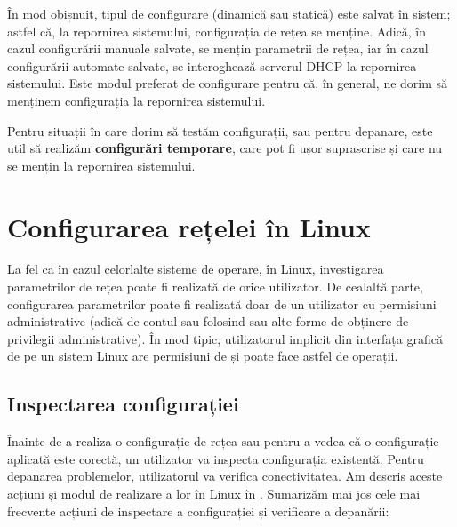 În mod obișnuit, tipul de configurare (dinamică sau statică) este salvat în sistem; astfel că, la repornirea sistemului, configurația de rețea se menține.
Adică, în cazul configurării manuale salvate, se mențin parametrii de rețea, iar în cazul configurării automate salvate, se interoghează serverul DHCP la repornirea sistemului.
Este modul preferat de configurare pentru că, în general, ne dorim să menținem configurația la repornirea sistemului.

Pentru situații în care dorim să testăm configurații, sau pentru depanare, este util să realizăm \textbf{configurări temporare}, care pot fi ușor suprascrise și care nu se mențin la repornirea sistemului.

\section{Configurarea rețelei în Linux}
\label{sec:net:linux-config}

La fel ca în cazul celorlalte sisteme de operare, în Linux, investigarea parametrilor de rețea poate fi realizată de orice utilizator.
De cealaltă parte, configurarea parametrilor poate fi realizată doar de un utilizator cu permisiuni administrative (adică de contul  sau folosind  sau alte forme de obținere de privilegii administrative).
În mod tipic, utilizatorul implicit din interfața grafică de pe un sistem Linux are permisiuni de  și poate face astfel de operații.

\subsection{Inspectarea configurației}
\label{sec:net:linux-config:inspect}

Înainte de a realiza o configurație de rețea sau pentru a vedea că o configurație aplicată este corectă, un utilizator va inspecta configurația existentă.
Pentru depanarea problemelor, utilizatorul va verifica conectivitatea.
Am descris aceste acțiuni și modul de realizare a lor în Linux în .
Sumarizăm mai jos cele mai frecvente acțiuni de inspectare a configurației și verificare a depanării:

